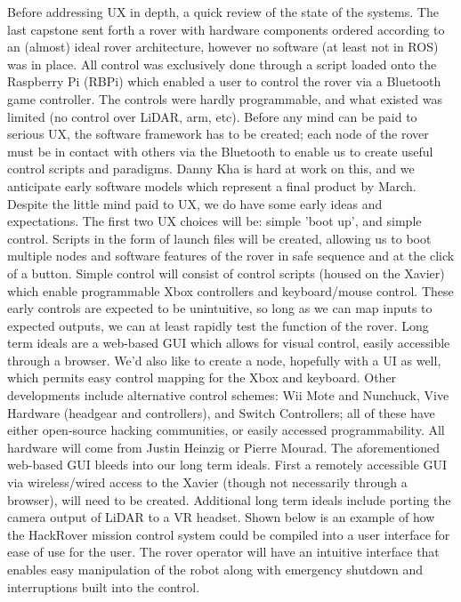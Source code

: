 \documentclass[a4paper, 10pt]{article}
\begin{document}
	Before addressing UX in depth, a quick review of the state of the systems. The last capstone sent forth a rover with hardware components ordered according to an (almost) ideal rover architecture, however no software (at least not in ROS) was in place. All control was exclusively done through a script loaded onto the Raspberry Pi (RBPi) which enabled a user to control the rover via a Bluetooth game controller. The controls were hardly programmable, and what existed was limited (no control over LiDAR, arm, etc). Before any mind can be paid to serious UX, the software framework has to be created; each node of the rover must be in contact with others via the Bluetooth to enable us to create useful control scripts and paradigms. Danny Kha is hard at work on this, and we anticipate early software models which represent a final product by March. 
Despite the little mind paid to UX, we do have some early ideas and expectations. The first two UX choices will be: simple 'boot up', and simple control. Scripts in the form of launch files will be created, allowing us to boot multiple nodes and software features of the rover in safe sequence and at the click of a button. Simple control will consist of control scripts (housed on the Xavier) which enable programmable Xbox controllers and keyboard/mouse control. These early controls are expected to be unintuitive, so long as we can map inputs to expected outputs, we can at least rapidly test the function of the rover. 
Long term ideals are a web-based GUI which allows for visual control, easily accessible through a browser. We'd also like to create a node, hopefully with a UI as well, which permits easy control mapping for the Xbox and keyboard. Other developments include alternative control schemes: Wii Mote and Nunchuck, Vive Hardware (headgear and controllers), and Switch Controllers; all of these have either open-source hacking communities, or easily accessed programmability. All hardware will come from Justin Heinzig or Pierre Mourad. 
The aforementioned web-based GUI bleeds into our long term ideals. First a remotely accessible GUI via wireless/wired access to the Xavier (though not necessarily through a browser), will need to be created. Additional long term ideals include porting the camera output of LiDAR to a VR headset. 
Shown below is an example of how the HackRover mission control system could be compiled into a user interface for ease of use for the user. The rover operator will have an intuitive interface that enables easy manipulation of the robot along with emergency shutdown and interruptions built into the control. 
\end{document}
